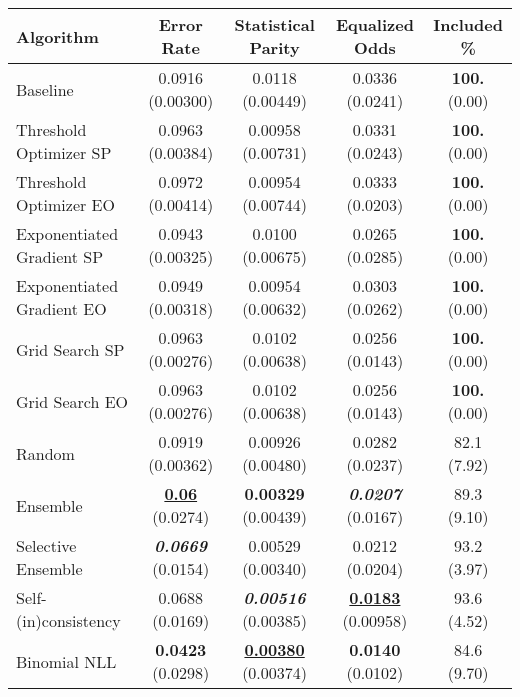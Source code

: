 \begin{tabular} {|l|c|c|c|c|}
\hline
\textbf{Algorithm} & \textbf{Error Rate} & \textbf{Statistical Parity} & \textbf{Equalized Odds} & \textbf{Included \%} \\ \hline
Baseline & 0.0916 (0.00300) & 0.0118 (0.00449) & 0.0336 (0.0241) & \textbf{100.} (0.00) \\ \hline 
Threshold Optimizer SP & 0.0963 (0.00384) & 0.00958 (0.00731) & 0.0331 (0.0243) & \textbf{100.} (0.00) \\ \hline 
Threshold Optimizer EO & 0.0972 (0.00414) & 0.00954 (0.00744) & 0.0333 (0.0203) & \textbf{100.} (0.00) \\ \hline 
Exponentiated Gradient SP & 0.0943 (0.00325) & 0.0100 (0.00675) & 0.0265 (0.0285) & \textbf{100.} (0.00) \\ \hline 
Exponentiated Gradient EO & 0.0949 (0.00318) & 0.00954 (0.00632) & 0.0303 (0.0262) & \textbf{100.} (0.00) \\ \hline 
Grid Search SP & 0.0963 (0.00276) & 0.0102 (0.00638) & 0.0256 (0.0143) & \textbf{100.} (0.00) \\ \hline 
Grid Search EO & 0.0963 (0.00276) & 0.0102 (0.00638) & 0.0256 (0.0143) & \textbf{100.} (0.00) \\ \hline 
Random & 0.0919 (0.00362) & 0.00926 (0.00480) & 0.0282 (0.0237) & 82.1 (7.92) \\ \hline 
Ensemble & \textbf{\underline{0.06}} (0.0274) & \textbf{0.00329} (0.00439) & \textbf{\textit{0.0207}} (0.0167) & 89.3 (9.10) \\ \hline 
Selective Ensemble & \textbf{\textit{0.0669}} (0.0154) & 0.00529 (0.00340) & 0.0212 (0.0204) & 93.2 (3.97) \\ \hline 
Self-(in)consistency & 0.0688 (0.0169) & \textbf{\textit{0.00516}} (0.00385) & \textbf{\underline{0.0183}} (0.00958) & 93.6 (4.52) \\ \hline 
Binomial NLL & \textbf{0.0423} (0.0298) & \textbf{\underline{0.00380}} (0.00374) & \textbf{0.0140} (0.0102) & 84.6 (9.70) \\ \hline 
\end{tabular}